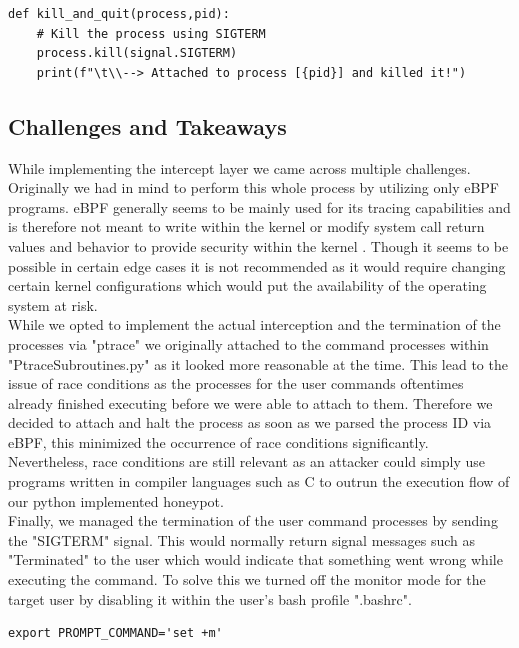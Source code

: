 \newpage

\begin{lstlisting}
def kill_and_quit(process,pid):
    # Kill the process using SIGTERM
    process.kill(signal.SIGTERM)
    print(f"\t\\--> Attached to process [{pid}] and killed it!")    
\end{lstlisting}

\subsection{Challenges and Takeaways}
While implementing the intercept layer we came across multiple challenges. Originally we had in mind to perform this whole process by utilizing only eBPF programs. eBPF generally seems to be mainly used for its tracing capabilities and is therefore not meant to write within the kernel or modify system call return values and behavior to provide security within the kernel \cite{bcc}. Though it seems to be possible in certain edge cases it is not recommended as it would require changing certain kernel configurations which would put the availability of the operating system at risk.\\
While we opted to implement the actual interception and the termination of the processes via "ptrace" we originally attached to the command processes within "PtraceSubroutines.py" as it looked more reasonable at the time. This lead to the issue of race conditions as the processes for the user commands oftentimes already finished executing before we were able to attach to them. Therefore we decided to attach and halt the process as soon as we parsed the process ID via eBPF, this minimized the occurrence of race conditions significantly. Nevertheless, race conditions are still relevant as an attacker could simply use programs written in compiler languages such as C to outrun the execution flow of our python implemented honeypot.\\ Finally, we managed the termination of the user command processes by sending the "SIGTERM" signal. This would normally return signal messages such as "Terminated" to the user which would indicate that something went wrong while executing the command. To solve this we turned off the monitor mode for the target user by disabling it within the user's bash profile ".bashrc".
\begin{lstlisting}
export PROMPT_COMMAND='set +m'    
\end{lstlisting}


\newpage

